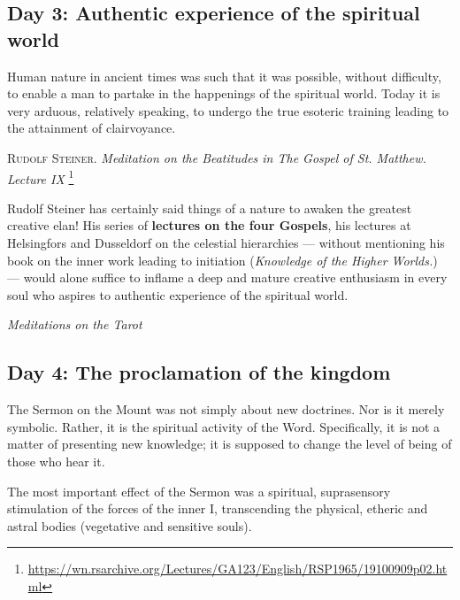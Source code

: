 \subsection*{Day 3: Authentic experience of the spiritual world}
\begin{quotationx}
Human nature in ancient times was such that it was possible, without difficulty, to enable a man to partake in the
happenings of the spiritual world. Today it is very arduous, relatively speaking, to undergo the true esoteric training
leading to the attainment of clairvoyance. 
\begin{flushright} \textsc{Rudolf Steiner}. \emph{Meditation on the Beatitudes in The
Gospel of St. Matthew. Lecture IX}
\footnote{\url{https://wn.rsarchive.org/Lectures/GA123/English/RSP1965/19100909p02.html}}
\end{flushright}

Rudolf Steiner has certainly said things of a nature to awaken the greatest creative elan! His series of
\textbf{lectures on the four Gospels}, his lectures at Helsingfors and Dusseldorf on the celestial hierarchies
— without mentioning his book on the inner work leading to initiation (\emph{Knowledge of the
Higher Worlds.}) — would alone suffice to inflame a deep and mature creative enthusiasm in every
soul who aspires to authentic experience of the spiritual world. 
\begin{flushright}\textit{Meditations on the Tarot}\end{flushright}

\end{quotationx}
\subsection*{Day 4: The proclamation of the kingdom}
The Sermon on the Mount was not simply about new doctrines. Nor is it merely symbolic. Rather, it is the spiritual
activity of the Word. Specifically, it is not a matter of presenting new knowledge; it is supposed to change the level
of being of those who hear it.

The most important effect of the Sermon was a spiritual, suprasensory stimulation of the forces of the inner I,
transcending the physical, etheric and astral bodies (vegetative and sensitive souls).

